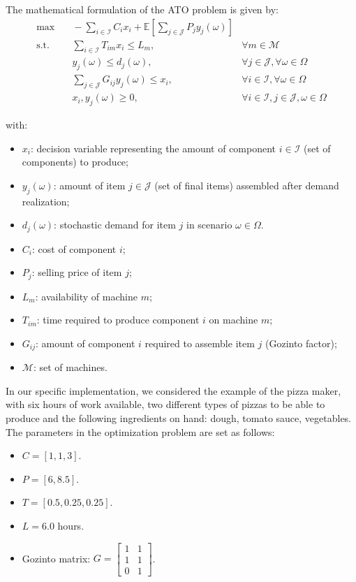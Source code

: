\documentclass[a4paper,12pt]{article}
\begin{document}
	The mathematical formulation of the ATO problem is given by:
	\[
	\begin{aligned}
		\max & \quad -\sum_{i \in \mathcal{I}} C_i x_i + \mathbb{E}\left[\sum_{j \in \mathcal{J}} P_j y_j(\omega)\right] \\
		\text{s.t.} & \quad \sum_{i \in \mathcal{I}} T_{im} x_i \leq L_m, & \forall m \in \mathcal{M} \\
		& \quad y_j(\omega) \leq d_j(\omega), & \forall j \in \mathcal{J}, \forall \omega \in \Omega \\
		& \quad \sum_{j \in \mathcal{J}} G_{ij} y_j(\omega) \leq x_i, & \forall i \in \mathcal{I}, \forall \omega \in \Omega \\
		& \quad x_i, y_j(\omega) \geq 0, & \forall i \in \mathcal{I}, j \in \mathcal{J}, \omega \in \Omega
	\end{aligned}
	\]
	
	with:
		
		\begin{itemize}
		\item $x_i$: decision variable representing the amount of component $i \in \mathcal{I}$ (set of components) to produce;
		\item $y_j(\omega)$: amount of item $j \in \mathcal{J}$ (set of final items) assembled after demand realization;
		\item $d_j(\omega)$: stochastic demand for item $j$ in scenario $\omega \in \Omega$.
		\item $C_i$: cost of component $i$;
		\item $P_j$: selling price of item $j$;
		\item $L_m$: availability of machine $m$;
		\item $T_{im}$: time required to produce component $i$ on machine $m$;
		\item $G_{ij}$: amount of component $i$ required to assemble item $j$ (Gozinto factor);
		\item $\mathcal{M}$: set of machines.
			
	\end{itemize}
In our specific implementation, we considered the example of the pizza maker, with six hours of work available, two different types of pizzas to be able to produce and the following ingredients on hand: dough, tomato sauce, vegetables. The parameters in the optimization problem are set as follows:  
		\begin{itemize}
		\item $C = [1, 1, 3]$.
		\item $P = [6, 8.5]$.
		\item $T = [0.5, 0.25, 0.25]$.
		\item $L = 6.0$ hours.
		\item Gozinto matrix: $G = \begin{bmatrix} 1 & 1 \\ 1 & 1 \\ 0 & 1 \end{bmatrix}$.
	\end{itemize}
	
\end{document}
